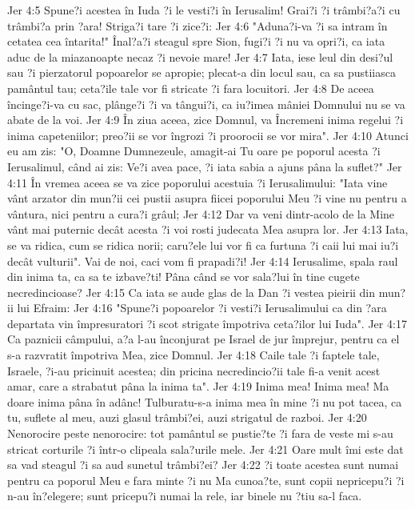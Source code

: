 Jer 4:5  Spune?i acestea în Iuda ?i le vesti?i în Ierusalim! Grai?i ?i trâmbi?a?i cu trâmbi?a prin ?ara! Striga?i tare ?i zice?i:
Jer 4:6  "Aduna?i-va ?i sa intram în cetatea cea întarita!" Înal?a?i steagul spre Sion, fugi?i ?i nu va opri?i, ca iata aduc de la miazanoapte necaz ?i nevoie mare!
Jer 4:7  Iata, iese leul din desi?ul sau ?i pierzatorul popoarelor se apropie; plecat-a din locul sau, ca sa pustiiasca pamântul tau; ceta?ile tale vor fi stricate ?i fara locuitori.
Jer 4:8  De aceea încinge?i-va cu sac, plânge?i ?i va tângui?i, ca iu?imea mâniei Domnului nu se va abate de la voi.
Jer 4:9  În ziua aceea, zice Domnul, va Încremeni inima regelui ?i inima capeteniilor; preo?ii se vor îngrozi ?i proorocii se vor mira".
Jer 4:10  Atunci eu am zis: "O, Doamne Dumnezeule, amagit-ai Tu oare pe poporul acesta ?i Ierusalimul, când ai zis: Ve?i avea pace, ?i iata sabia a ajuns pâna la suflet?"
Jer 4:11  În vremea aceea se va zice poporului acestuia ?i Ierusalimului: "Iata vine vânt arzator din mun?ii cei pustii asupra fiicei poporului Meu ?i vine nu pentru a vântura, nici pentru a cura?i grâul;
Jer 4:12  Dar va veni dintr-acolo de la Mine vânt mai puternic decât acesta ?i voi rosti judecata Mea asupra lor.
Jer 4:13  Iata, se va ridica, cum se ridica norii; caru?ele lui vor fi ca furtuna ?i caii lui mai iu?i decât vulturii". Vai de noi, caci vom fi prapadi?i!
Jer 4:14  Ierusalime, spala raul din inima ta, ca sa te izbave?ti! Pâna când se vor sala?lui în tine cugete necredincioase?
Jer 4:15  Ca iata se aude glas de la Dan ?i vestea pieirii din mun?ii lui Efraim:
Jer 4:16  "Spune?i popoarelor ?i vesti?i Ierusalimului ca din ?ara departata vin împresuratori ?i scot strigate împotriva ceta?ilor lui Iuda".
Jer 4:17  Ca paznicii câmpului, a?a l-au înconjurat pe Israel de jur împrejur, pentru ca el s-a razvratit împotriva Mea, zice Domnul.
Jer 4:18  Caile tale ?i faptele tale, Israele, ?i-au pricinuit acestea; din pricina necredincio?ii tale fi-a venit acest amar, care a strabatut pâna la inima ta".
Jer 4:19  Inima mea! Inima mea! Ma doare inima pâna în adânc! Tulburatu-s-a inima mea în mine ?i nu pot tacea, ca tu, suflete al meu, auzi glasul trâmbi?ei, auzi strigatul de razboi.
Jer 4:20  Nenorocire peste nenorocire: tot pamântul se pustie?te ?i fara de veste mi s-au stricat corturile ?i într-o clipeala sala?urile mele.
Jer 4:21  Oare mult îmi este dat sa vad steagul ?i sa aud sunetul trâmbi?ei?
Jer 4:22  ?i toate acestea sunt numai pentru ca poporul Meu e fara minte ?i nu Ma cunoa?te, sunt copii nepricepu?i ?i n-au în?elegere; sunt pricepu?i numai la rele, iar binele nu ?tiu sa-l faca.
